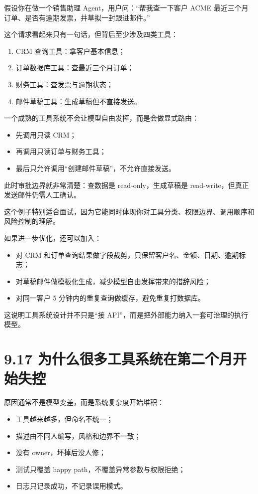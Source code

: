 假设你在做一个销售助理 Agent，用户问：``帮我查一下客户 ACME 最近三个月订单、是否有逾期发票，并草拟一封跟进邮件。''

这个请求看起来只有一句话，但背后至少涉及四类工具：


\begin{enumerate}[leftmargin=2em]
\item CRM 查询工具：拿客户基本信息；
\item 订单数据库工具：查最近三个月订单；
\item 财务工具：查发票与逾期状态；
\item 邮件草稿工具：生成草稿但不直接发送。
\end{enumerate}

一个成熟的工具系统不会让模型自由发挥，而是会做显式路由：


\begin{itemize}[leftmargin=2em]
\item 先调用只读 CRM；
\item 再调用只读订单与财务工具；
\item 最后只允许调用``创建邮件草稿''，不允许直接发送。
\end{itemize}

此时审批边界就非常清楚：查数据是 read-only，生成草稿是 read-write，但真正发送邮件仍需人工确认。

这个例子特别适合面试，因为它能同时体现你对工具分类、权限边界、调用顺序和风险控制的理解。


如果进一步优化，还可以加入：


\begin{itemize}[leftmargin=2em]
\item 对 CRM 和订单查询结果做字段裁剪，只保留客户名、金额、日期、逾期标志；
\item 对草稿邮件做模板化生成，减少模型自由发挥带来的措辞风险；
\item 对同一客户 5 分钟内的重复查询做缓存，避免重复打数据库。
\end{itemize}

这说明工具系统设计并不只是``接 API''，而是把外部能力纳入一套可治理的执行模型。


\section{9.17 为什么很多工具系统在第二个月开始失控}

原因通常不是模型变差，而是系统复杂度开始堆积：


\begin{itemize}[leftmargin=2em]
\item 工具越来越多，但命名不统一；
\item 描述由不同人编写，风格和边界不一致；
\item 没有 owner，坏掉后没人修；
\item 测试只覆盖 happy path，不覆盖异常参数与权限拒绝；
\item 日志只记录成功，不记录误用模式。
\end{itemize}

